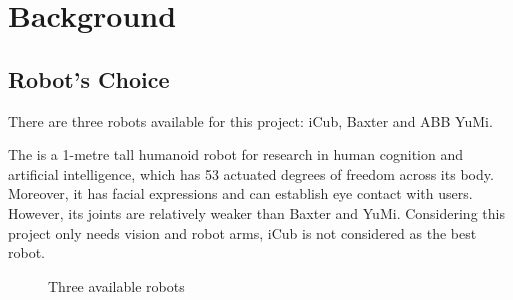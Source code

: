 \chapter{Background}

\section{Robot's Choice}
There are three robots available for this project: iCub, Baxter and ABB YuMi.

The \citep{iCub} is a 1-metre tall humanoid robot for research in human cognition and artificial intelligence, which has 53 actuated degrees of freedom across its body. Moreover, it has facial expressions and can establish eye contact with users. However, its joints are relatively weaker than Baxter and YuMi. Considering this project only needs vision and robot arms, iCub is not considered as the best robot.

\begin{figure}[H]
\centering
{}
\caption{Three available robots}
\label{robot}
\end{figure}

